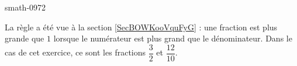 
\begin{corrige}{smath-0972}

    La règle a été vue à la section \ref{SecBOWKooVquFyG} : une fraction est plus grande que \( 1\) lorsque le numérateur est plus grand que le dénominateur. Dans le cas de cet exercice, ce sont les fractions \( \dfrac{ 3 }{ 2 }\) et \( \dfrac{ 12 }{ 10 }\).

\end{corrige}

